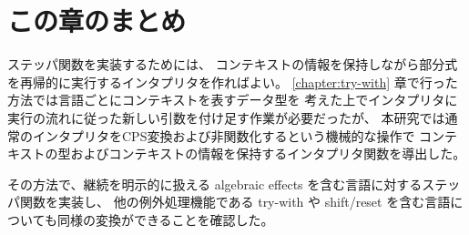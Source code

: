 \section{この章のまとめ}
\label{section:conclusion}

ステッパ関数を実装するためには、
コンテキストの情報を保持しながら部分式を再帰的に実行するインタプリタを作ればよい。
\ref{chapter:try-with} 章で行った方法では言語ごとにコンテキストを表すデータ型を
考えた上でインタプリタに実行の流れに従った新しい引数を付け足す作業が必要だったが、
本研究では通常のインタプリタをCPS変換および非関数化するという機械的な操作で
コンテキストの型およびコンテキストの情報を保持するインタプリタ関数を導出した。

その方法で、継続を明示的に扱える algebraic effects を含む言語に対するステッパ関数を実装し、
他の例外処理機能である try-with や shift/reset を含む言語についても同様の変換ができることを確認した。
